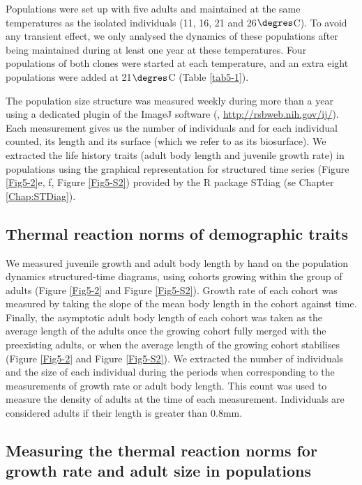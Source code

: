 Populations were set up with five adults and maintained at the same temperatures
as the isolated individuals (11, 16, 21 and 26$\degres$C). To avoid any transient
effect, we only analysed the dynamics of these populations after being
maintained during at least one year at these temperatures. Four populations of
both clones were started at each temperature, and an extra eight populations
were added at 21$\degres$C (Table \ref{tab5-1}).

The population size structure was measured weekly during more than a year using
a dedicated plugin \autocite{mallard2012a,mallard2013a} of the ImageJ software
(\citealp{abramoff2004a}, \url{http://rsbweb.nih.gov/ij/}). Each
measurement gives us the number of individuals and for each individual counted, its length and its surface (which we refer to
as its biosurface). We extracted the life history traits (adult body length and
juvenile growth rate) in populations using the graphical representation for
structured time series (Figure \ref{Fig5-2}e, f, Figure \ref{Fig5-S2}) provided by the R
package STdiag (se  Chapter \ref{Chap:STDiag}).

\subsection{Thermal reaction norms of demographic traits}

We measured juvenile growth and adult body length by hand on the population
dynamics structured-time diagrams, using cohorts growing within the group of
adults (Figure \ref{Fig5-2} and Figure \ref{Fig5-S2}). Growth rate of each
cohort was measured by taking the slope of the mean body length in the cohort
against time. Finally, the asymptotic adult body length of each cohort was taken
as the average length of the adults once the growing cohort fully merged with
the preexisting adults, or when the average length of the growing cohort
stabilises (Figure \ref{Fig5-2} and Figure \ref{Fig5-S2}). We extracted the
number of individuals and the size of each individual during the periods when
corresponding to the measurements of growth rate or adult body length. This
count was used to measure the density of adults at the time of each measurement.
Individuals are considered adults if their length is greater than 0.8mm.

\subsection{Measuring the thermal reaction norms for growth rate and adult size
in populations}

